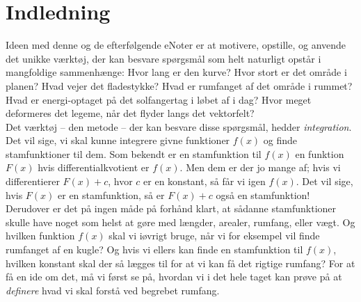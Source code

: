 











\section{Indledning} \label{secIndledning}

Ideen med denne og de efterfølgende eNoter er at motivere, opstille, og anvende det unikke
værktøj, der kan besvare spørgsmål som helt naturligt opstår i mangfoldige sammenhænge: Hvor lang
er den kurve? Hvor stort er det område i planen?
Hvad vejer det fladestykke? Hvad er rumfanget af
det område i rummet? Hvad er energi-optaget på
det solfangertag i løbet af i dag? Hvor meget
deformeres det legeme, når det flyder langs det
vektorfelt?\\

Det værktøj -- den metode -- der kan besvare disse
spørgsmål, hedder {\emph{integration}}. Det vil sige, vi skal kunne integrere givne funktioner $f(x)$ og finde stamfunktioner til dem. Som bekendt er en stamfunktion til $f(x)$ en funktion $F(x)$ hvis differentialkvotient er $f(x)$. Men dem er der jo mange af; hvis vi differentierer $F(x) + c$, hvor $c$ er en konstant, så får vi igen $f(x)$. Det vil sige, hvis $F(x)$ er en stamfunktion, så er $F(x) + c$ også en stamfunktion!\\


Derudover er det på ingen måde på forhånd klart, at sådanne stamfunktioner skulle have noget som helst at gøre med
længder, arealer, rumfang, eller vægt. Og hvilken funktion $f(x)$ skal vi iøvrigt bruge,
når vi  for eksempel vil finde rumfanget af en kugle? Og hvis vi ellers kan finde en stamfunktion
til $f(x)$, hvilken konstant skal der så lægges til for at vi kan få det rigtige rumfang? For at få en ide om det, må vi først se på, hvordan vi i det hele taget kan prøve på at {\emph{definere}} hvad vi skal forstå ved begrebet rumfang.


